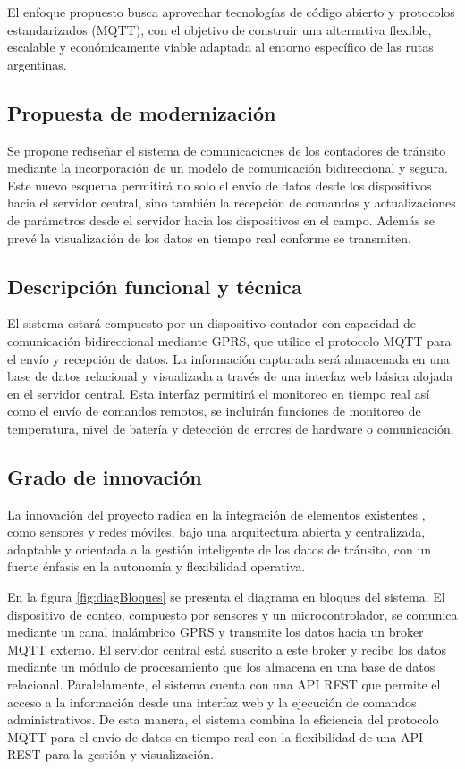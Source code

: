 \documentclass[
11pt, %
]{charter}
\begin{document}
El enfoque propuesto busca aprovechar tecnologías de código abierto y protocolos estandarizados (MQTT), con el objetivo de construir una alternativa flexible, escalable y económicamente viable adaptada al entorno específico de las rutas argentinas.
\subsection{Propuesta de modernización}

Se propone rediseñar el sistema de comunicaciones de los contadores de tránsito mediante la incorporación de un modelo de comunicación bidireccional y segura.
Este nuevo esquema permitirá no solo el envío de datos desde los dispositivos hacia el servidor central, sino también la recepción de comandos y actualizaciones de parámetros desde el servidor hacia los dispositivos en el campo.
Además se prevé la visualización de los datos en tiempo real conforme se transmiten.

\subsection{Descripción funcional y técnica}

El sistema estará compuesto por un dispositivo contador con capacidad de comunicación bidireccional mediante GPRS, que utilice el protocolo MQTT para el envío y recepción de datos. La información capturada será almacenada en una base de datos relacional y visualizada a través de una interfaz web básica alojada en el servidor central. Esta interfaz permitirá el monitoreo en tiempo real así como el envío de comandos remotos, se incluirán funciones de monitoreo de temperatura, nivel de batería y detección de errores de hardware o comunicación.




\subsection{Grado de innovación}
La innovación del proyecto radica en la integración de elementos existentes , como sensores y redes móviles, bajo una arquitectura abierta y centralizada, adaptable y orientada a la gestión inteligente de los datos de tránsito, con un fuerte énfasis en la autonomía y flexibilidad operativa.


En la figura \ref{fig:diagBloques} se presenta el diagrama en bloques del sistema. El dispositivo de conteo, compuesto por sensores y un microcontrolador, se comunica mediante un canal inalámbrico GPRS y transmite los datos hacia un broker MQTT externo. El servidor central está suscrito a este broker y recibe los datos mediante un módulo de procesamiento que los almacena en una base de datos relacional. Paralelamente, el sistema cuenta con una API REST que permite el acceso a la información desde una interfaz web y la ejecución de comandos administrativos. De esta manera, el sistema combina la eficiencia del protocolo MQTT para el envío de datos en tiempo real con la flexibilidad de una API REST para la gestión y visualización.
\end{document}

